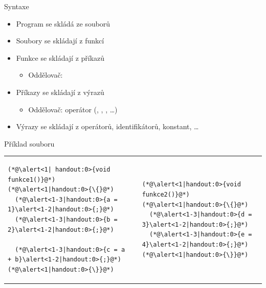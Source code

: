 \begin{frame}[fragile]{Syntaxe}

  \begin{itemize}
    \item Program se skládá ze souborů
    \item Soubory se skládají z funkcí

    \pause

    \item Funkce se skládají z příkazů
    \begin{itemize}
      \item Oddělovač: \code{;}
    \end{itemize}

    \pause

    \item Příkazy se skládají z výrazů
    \begin{itemize}
      \item Oddělovač: operátor (\code{+}, \code{\-}, \code{=}, \dots)
    \end{itemize}

    \pause

    \item Výrazy se skládají z operátorů, identifikátorů, konstant, \dots
  \end{itemize}


  \begin{block}{Příklad souboru}
    \begin{tabular}{lp{5em}l}
  \begin{lstlisting}
(*@\alert<1| handout:0>{void funkce1()}@*)
(*@\alert<1|handout:0>{\{}@*)
  (*@\alert<1-3|handout:0>{a = 1}\alert<1-2|handout:0>{;}@*)
  (*@\alert<1-3|handout:0>{b = 2}\alert<1-2|handout:0>{;}@*)

  (*@\alert<1-3|handout:0>{c = a + b}\alert<1-2|handout:0>{;}@*)
(*@\alert<1|handout:0>{\}}@*)
  \end{lstlisting}
    &&
  \begin{lstlisting}
(*@\alert<1|handout:0>{void funkce2()}@*)
(*@\alert<1|handout:0>{\{}@*)
  (*@\alert<1-3|handout:0>{d = 3}\alert<1-2|handout:0>{;}@*)
  (*@\alert<1-3|handout:0>{e = 4}\alert<1-2|handout:0>{;}@*)
(*@\alert<1|handout:0>{\}}@*)
  \end{lstlisting}
  \end{tabular}
  \end{block}

\end{frame}

